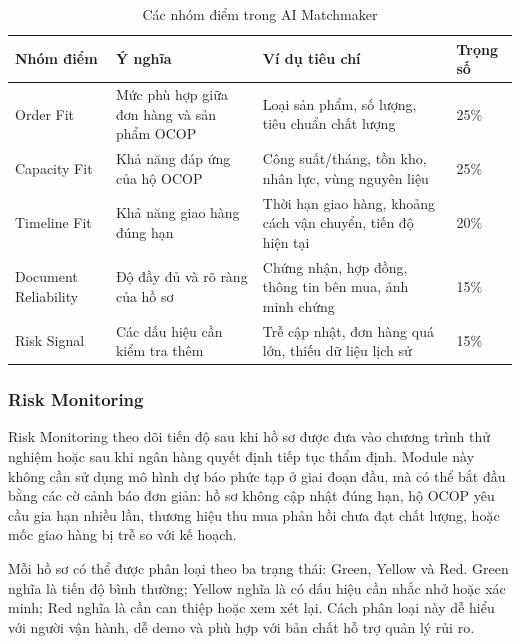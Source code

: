 \documentclass[13pt,a4paper]{extarticle}
\begin{document}
\begin{table}[H]
\centering
\caption{Các nhóm điểm trong AI Matchmaker}
\begin{tabular}{|p{3cm}|p{3cm}|p{5cm}|p{2cm}|}
\hline
\textbf{Nhóm điểm} & \textbf{Ý nghĩa} & \textbf{Ví dụ tiêu chí} & \textbf{Trọng số} \\
\hline
Order Fit & Mức phù hợp giữa đơn hàng và sản phẩm OCOP & Loại sản phẩm, số lượng, tiêu chuẩn chất lượng & 25\% \\
\hline
Capacity Fit & Khả năng đáp ứng của hộ OCOP & Công suất/tháng, tồn kho, nhân lực, vùng nguyên liệu & 25\% \\
\hline
Timeline Fit & Khả năng giao hàng đúng hạn & Thời hạn giao hàng, khoảng cách vận chuyển, tiến độ hiện tại & 20\% \\
\hline
Document Reliability & Độ đầy đủ và rõ ràng của hồ sơ & Chứng nhận, hợp đồng, thông tin bên mua, ảnh minh chứng & 15\% \\
\hline
Risk Signal & Các dấu hiệu cần kiểm tra thêm & Trễ cập nhật, đơn hàng quá lớn, thiếu dữ liệu lịch sử & 15\% \\
\hline
\end{tabular}
\end{table}

\subsubsection{Risk Monitoring}

Risk Monitoring theo dõi tiến độ sau khi hồ sơ được đưa vào chương trình thử nghiệm hoặc sau khi ngân hàng quyết định tiếp tục thẩm định. Module này không cần sử dụng mô hình dự báo phức tạp ở giai đoạn đầu, mà có thể bắt đầu bằng các cờ cảnh báo đơn giản: hồ sơ không cập nhật đúng hạn, hộ OCOP yêu cầu gia hạn nhiều lần, thương hiệu thu mua phản hồi chưa đạt chất lượng, hoặc mốc giao hàng bị trễ so với kế hoạch.

Mỗi hồ sơ có thể được phân loại theo ba trạng thái: Green, Yellow và Red. Green nghĩa là tiến độ bình thường; Yellow nghĩa là có dấu hiệu cần nhắc nhở hoặc xác minh; Red nghĩa là cần can thiệp hoặc xem xét lại. Cách phân loại này dễ hiểu với người vận hành, dễ demo và phù hợp với bản chất hỗ trợ quản lý rủi ro.
\end{document}
